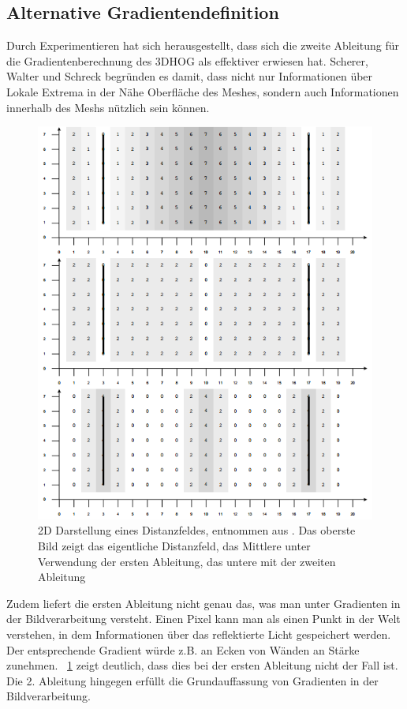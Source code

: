 \subsection{Alternative Gradientendefinition}
Durch Experimentieren hat sich herausgestellt, dass sich die zweite Ableitung für die Gradientenberechnung des 3DHOG als effektiver erwiesen hat. Scherer, Walter und Schreck \cite{scherer2010histograms} begründen es damit, dass nicht nur Informationen über Lokale Extrema in der Nähe Oberfläche des Meshes, sondern auch Informationen innerhalb des Meshs nützlich sein können. 
 \begin{figure}[thpb]
 	\centering
 	\includegraphics[width=\linewidth]{3-Diskussion/pics/2D_distance_field - Kopie.png}
 	\caption{2D Darstellung eines Distanzfeldes, entnommen aus \cite{scherer2010histograms}. Das oberste Bild zeigt das eigentliche Distanzfeld, das Mittlere unter Verwendung der ersten Ableitung, das untere mit der zweiten Ableitung}
 	\label{2D_distance_field}
 \end{figure}
 Zudem liefert die ersten Ableitung nicht genau das, was man unter Gradienten in der Bildverarbeitung versteht. Einen Pixel kann man als einen Punkt in der Welt verstehen, in dem Informationen über das reflektierte Licht gespeichert werden. Der entsprechende Gradient würde z.B. an Ecken von Wänden an Stärke zunehmen. \figurename~\ref{2D_distance_field} zeigt deutlich, dass dies bei der ersten Ableitung nicht der Fall ist. Die 2. Ableitung hingegen erfüllt die Grundauffassung von Gradienten in der Bildverarbeitung.
 \newline
 
 